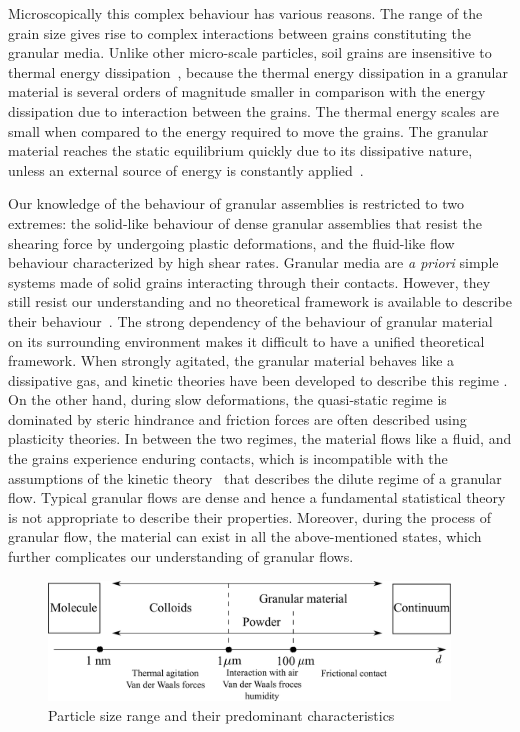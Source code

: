 Microscopically this complex behaviour has various reasons. The range of the 
grain size gives rise to complex interactions between grains constituting the 
granular media. Unlike other micro-scale particles, soil grains are insensitive 
to thermal energy dissipation~\citep{Mehta2011}, because the thermal energy 
dissipation in a granular material is several orders of magnitude smaller in 
comparison with the energy dissipation due to interaction between the grains. 
The thermal energy scales are small when compared to the energy required to 
move the grains. The granular material reaches the static equilibrium quickly 
due to its dissipative nature, unless an external source of energy is 
constantly applied~\citep{Choi2005}. 

Our knowledge of the behaviour of granular assemblies 
is restricted to two extremes: the solid-like behaviour of dense granular 
assemblies that resist the shearing force by undergoing plastic deformations, 
and the fluid-like flow behaviour characterized by high shear rates. Granular 
media are \textit{a priori} simple systems made of solid grains interacting 
through their contacts. However, they still resist our understanding and no 
theoretical framework is available to describe their 
behaviour~\citep{Pouliquen2006}. The strong dependency of the behaviour of 
granular material on its surrounding environment makes it difficult to have a 
unified theoretical framework. When strongly agitated, the granular material 
behaves like a dissipative gas, and kinetic theories have been developed to 
describe this regime \citep{Xu2003,Popken1999}. On the other hand, during slow 
deformations, the quasi-static regime is dominated by steric hindrance and 
friction forces are often described using plasticity theories. In between the 
two regimes, the material flows like a fluid, and the grains experience 
enduring contacts, which is incompatible with the assumptions of the kinetic 
theory~\citep{Pouliquen2006} that describes the dilute regime of a granular 
flow. Typical granular flows are dense and hence a fundamental statistical 
theory is not appropriate to describe their properties. Moreover, during the 
process of granular flow, the material can exist in all the above-mentioned 
states, which further complicates our understanding of granular flows.

\begin{figure}[htbp]
\centering
\includegraphics[width=0.95\textwidth]{Granular}
\caption{Particle size range and their predominant characteristics}
\label{fig:granular}
\end{figure}

